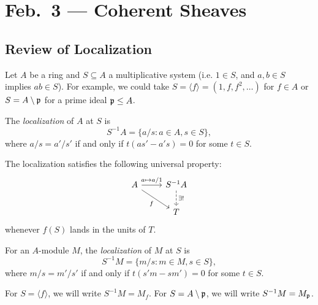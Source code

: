 \chapter{Feb.~3 --- Coherent Sheaves}

\section{Review of Localization}

\begin{remark}
  Let $A$ be a ring and $S \subseteq A$
  a multiplicative system (i.e.
  $1 \in S$, and $a, b \in S$ implies
  $ab \in S$).
  For example, we could take
  $S = \langle f \rangle = (1, f, f^2, \dots)$
  for $f \in A$ or $S = A \setminus \mathfrak{p}$
  for a prime ideal $\mathfrak{p} \le A$.
\end{remark}

\begin{definition}
  The \emph{localization} of $A$ at $S$
  is
  \[
    S^{-1} A = \{ a / s : a \in A, s \in S\},
  \]
  where $a / s = a' / s'$
  if and only if $t(a s' - a' s) = 0$
  for some $t \in S$.
\end{definition}

\begin{remark}
  The localization satisfies the
  following universal property:
  \[
    \begin{tikzcd}
      A \ar[r, "a \mapsto a / 1"] \ar[dr, "f", swap]
      & S^{-1} A \ar[d, dashed, "\exists !"] \\
      & T
    \end{tikzcd}
  \]
  whenever $f(S)$ lands in
  the units of $T$.
\end{remark}

\begin{definition}
  For an $A$-module $M$, the
  \emph{localization} of $M$ at $S$ is
  \[
    S^{-1} M = \{ m / s : m \in M, s \in S\},
  \]
  where $m / s = m' / s'$
  if and only if
  $t(s' m - s m') = 0$
  for some $t \in S$.
\end{definition}

\begin{remark}
  For $S = \langle f \rangle$, we
  will write $S^{-1} M = M_f$.
  For $S = A \setminus \mathfrak{p}$,
  we will write
  $S^{-1} M = M_{\mathfrak{p}}$.
\end{remark}

